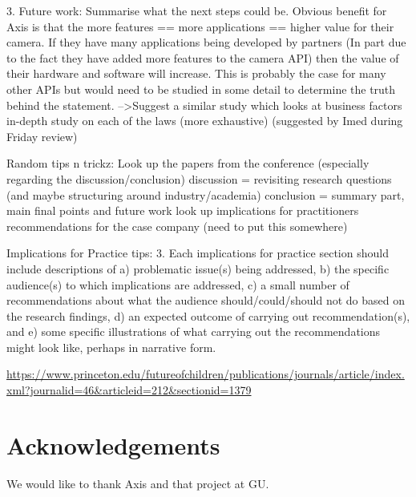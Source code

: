 \documentclass{sig-alternate}
\begin{document}
3. Future work: Summarise what the next steps could be.
Obvious benefit for Axis is that the more features == more applications == higher value for their camera. If they have many applications being developed by partners (In part due to the fact they have added more features to the camera API) then the value of their hardware and software will increase. This is probably the case for many other APIs but would need to be studied in some detail to determine the truth behind the statement.
       -->Suggest a similar study which looks at business factors
 in-depth study on each of the laws (more exhaustive) (suggested by Imed during Friday review)

Random tips n trickz:
       Look up the papers from the conference (especially regarding the discussion/conclusion)
       discussion = revisiting research questions (and maybe structuring around industry/academia)
       conclusion = summary part, main final points and future work 
       look up implications for practitioners 
       recommendations for the case company (need to put this somewhere)



Implications for Practice tips: 
       3. Each implications for practice section should include descriptions of a) problematic issue(s) being addressed, b) the specific audience(s) to which implications are addressed, c) a small number of recommendations about what the audience should/could/should not do based on the research findings, d) an expected outcome of carrying out recommendation(s), and e) some specific illustrations of what carrying out the recommendations might look like, perhaps in narrative form.

\url{https://www.princeton.edu/futureofchildren/publications/journals/article/index.xml?journalid=46&articleid=212&sectionid=1379}



\section{Acknowledgements}
We would like to thank Axis and that project at GU. 


 
\end{document}
